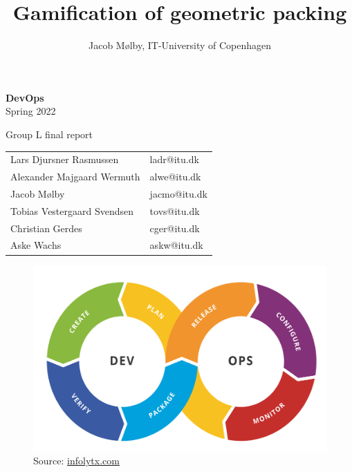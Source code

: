 \documentclass{article}
\title{Gamification of geometric packing}
\author{Jacob Mølby, IT-University of Copenhagen}
\date{}
\newcommand{\imagewidth}{16cm}
\begin{document}
\begin{titlepage}
    \begin{center}
        \vspace*{1cm}
            
        \Huge
        \textbf{DevOps}\\
        \normalsize   
        \vspace*{0.5cm}
        Spring 2022\\
        \vspace{0.5cm}

        \LARGE
        Group L final report
    
            
        {\renewcommand{\arraystretch}{1.3}%
            \begin{table}[H]
            \centering
            \begin{tabular}{l|l}
            Lars Djursner Rasmussen     & ladr@itu.dk  \\
            Alexander Majgaard Wermuth           & alwe@itu.dk  \\
            Jacob Mølby                 & jacmo@itu.dk \\
            Tobias Vestergaard Svendsen & tovs@itu.dk  \\
            Christian Gerdes     & cger@itu.dk  \\
            Aske Wachs                  & askw@itu.dk
            \end{tabular}
            \end{table}
        }
        \normalsize
        \begin{figure}[H]
        \centering
        \includegraphics[width=\imagewidth]{DevOps.png}
        \caption{Source: \url{infolytx.com}}
        \end{figure}
        \vfill
     

\end{center}
\end{titlepage}
\end{document}
